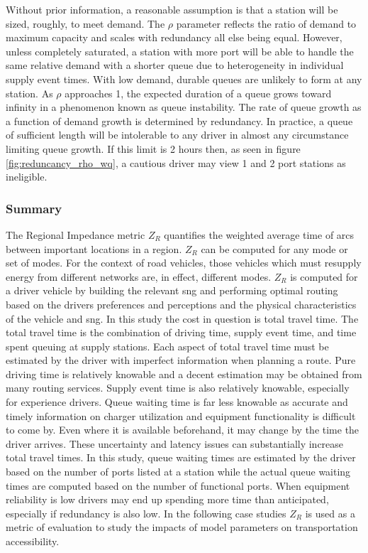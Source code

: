 \documentclass[11pt]{article}
\begin{document}
\begin{multicols}{2}
Without prior information, a reasonable assumption is that a station will be sized, roughly, to meet demand. The $\rho$ parameter reflects the ratio of demand to maximum capacity and scales with redundancy all else being equal. However, unless completely saturated, a station with more port will be able to handle the same relative demand with a shorter queue due to heterogeneity in individual supply event times. With low demand, durable queues are unlikely to form at any station. As $\rho$ approaches 1, the expected duration of a queue grows toward infinity in a phenomenon known as queue instability. The rate of queue growth as a function of demand growth is determined by redundancy. In practice, a queue of sufficient length will be intolerable to any driver in almost any circumstance limiting queue growth. If this limit is 2 hours then, as seen in figure \ref{fig:reduncancy_rho_wq}, a cautious driver may view 1 and 2 port stations as ineligible.

\subsubsection*{Summary}

The Regional Impedance metric $Z_R$ quantifies the weighted average time of arcs between important locations in a region. $Z_R$ can be computed for any mode or set of modes. For the context of road vehicles, those vehicles which must resupply energy from different networks are, in effect, different modes. $Z_R$ is computed for a driver vehicle by building the relevant \gls{sng} and performing optimal routing based on the drivers preferences and perceptions and the physical characteristics of the vehicle and \gls{sng}. In this study the cost in question is total travel time. The total travel time is the combination of driving time, supply event time, and time spent queuing at supply stations. Each aspect of total travel time must be estimated by the driver with imperfect information when planning a route. Pure driving time is relatively knowable and a decent estimation may be obtained from many routing services. Supply event time is also relatively knowable, especially for experience drivers. Queue waiting time is far less knowable as accurate and timely information on charger utilization and equipment functionality is difficult to come by. Even where it is available beforehand, it may change by the time the driver arrives. These uncertainty and latency issues can substantially increase total travel times. In this study, queue waiting times are estimated by the driver based on the number of ports listed at a station while the actual queue waiting times are computed based on the number of functional ports. When equipment reliability is low drivers may end up spending more time than anticipated, especially if redundancy is also low. In the following case studies $Z_R$ is used as a metric of evaluation to study the impacts of model parameters on transportation accessibility.


\end{multicols}
\end{document}
